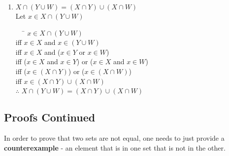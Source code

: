\documentclass[../notes.tex]{subfiles}
\begin{document}
\begin{enumerate}[label=(\alph*)]
					\item $X \cap (Y \cup W) = (X \cap Y) \cup (X \cap W)$\\
						Let $x \in X \cap (Y \cup W)$
						\begin{tabbing}
							$\quad$ \= $x \in X \cap (Y \cup W)$\\
							iff \> $x \in X$ and $x \in (Y \cup W)$\\
							iff \> $x \in X$ and ($x \in Y$ or $x \in W$)\\
							iff \> ($x \in X$ and $x \in Y$) or ($x \in X$ and $x \in W$)\\
							iff \> ($x \in (X \cap Y)$) or ($x \in (X \cap W)$)\\
							iff \> $x \in (X \cap Y) \cup (X \cap W)$\\
							$\therefore$ \> $X \cap (Y \cup W) = (X \cap Y) \cup (X \cap W)$
						\end{tabbing}
				\end{enumerate}
			\pagebreak
			\subsection{Proofs Continued}
			In order to prove that two sets are not equal, one needs to just provide a \textbf{counterexample} - an element that is in one set that is not in the other.
	
\end{document}
